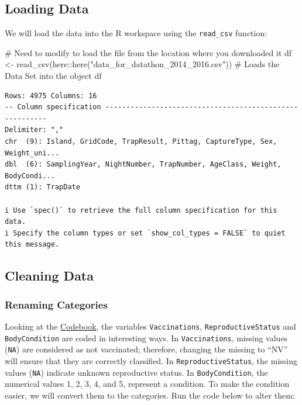 \documentclass[
  letterpaper,
]{report}
\newenvironment{Shaded}{\begin{snugshade}}{\end{snugshade}}
\newcommand{\CommentTok}[1]{\textcolor[rgb]{0.37,0.37,0.37}{#1}}
\newcommand{\FunctionTok}[1]{\textcolor[rgb]{0.28,0.35,0.67}{#1}}
\newcommand{\NormalTok}[1]{\textcolor[rgb]{0.00,0.23,0.31}{#1}}
\newcommand{\OtherTok}[1]{\textcolor[rgb]{0.00,0.23,0.31}{#1}}
\newcommand{\SpecialCharTok}[1]{\textcolor[rgb]{0.37,0.37,0.37}{#1}}
\newcommand{\StringTok}[1]{\textcolor[rgb]{0.13,0.47,0.30}{#1}}
\begin{document}
\subsection{Loading Data}\label{loading-data}

We will load the data into the R workspace using the \texttt{read\_csv}
function:

\begin{Shaded}
\begin{Highlighting}[]
\CommentTok{\# Need to modify to load the file from the location where you downloaded it}
\NormalTok{df }\OtherTok{\textless{}{-}} \FunctionTok{read\_csv}\NormalTok{(here}\SpecialCharTok{::}\FunctionTok{here}\NormalTok{(}\StringTok{"data\_for\_datathon\_2014\_2016.csv"}\NormalTok{)) }\CommentTok{\# Loads the Data Set into the object df}
\end{Highlighting}
\end{Shaded}

\begin{verbatim}
Rows: 4975 Columns: 16
-- Column specification --------------------------------------------------------
Delimiter: ","
chr  (9): Island, GridCode, TrapResult, Pittag, CaptureType, Sex, Weight_uni...
dbl  (6): SamplingYear, NightNumber, TrapNumber, AgeClass, Weight, BodyCondi...
dttm (1): TrapDate

i Use `spec()` to retrieve the full column specification for this data.
i Specify the column types or set `show_col_types = FALSE` to quiet this message.
\end{verbatim}

\subsection{Cleaning Data}\label{cleaning-data}

\subsubsection{Renaming Categories}\label{renaming-categories}

Looking at the
\href{https://github.com/mludkov/UCSB_Data_Day_2026/blob/gh-pages/IslandFoxes_codebook.pdf}{Codebook},
the variables \texttt{Vaccinations}, \texttt{ReproductiveStatus} and
\texttt{BodyCondition} are coded in interesting ways. In
\texttt{Vaccinations}, missing values (\texttt{NA}) are considered as
not vaccinated; therefore, changing the missing to ``NV'' will ensure
that they are correctly classified. In \texttt{ReproductiveStatus}, the
missing values (\texttt{NA}) indicate unknown reproductive status. In
\texttt{BodyCondition}, the numerical values 1, 2, 3, 4, and 5,
represent a condition. To make the condition easier, we will convert
them to the categories. Run the code below to alter them:
\end{document}
